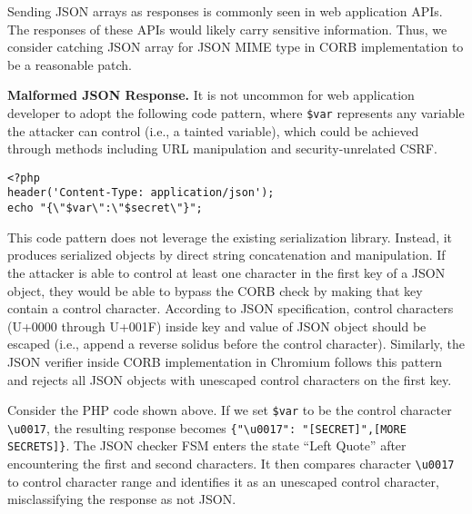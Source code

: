\documentclass[10pt,conference]{IEEEtran}
\begin{document}
Sending JSON arrays as responses is commonly seen in web application APIs. The responses of these APIs would likely carry sensitive information. Thus, we consider catching JSON array for JSON MIME type in CORB implementation to be a reasonable patch. 


\textbf{Malformed JSON Response.} It is not uncommon for web application developer to adopt the following code pattern, where \verb|$var| represents any variable the attacker can control (i.e., a tainted variable), which could be achieved through methods including URL manipulation and security-unrelated CSRF\cite{shankar_d1r3wolf_chaining_nodate}.%



\begin{lstlisting}
<?php
header('Content-Type: application/json');
echo "{\"$var\":\"$secret\"}";
\end{lstlisting}

This code pattern does not leverage the existing serialization library. Instead, it produces serialized objects by direct string concatenation and manipulation. If the attacker is able to control at least one character in the first key of a JSON object, they would be able to bypass the CORB check by making that key contain a control character. According to JSON specification, control characters (U+0000 through U+001F) inside key and value of JSON object should be escaped (i.e., append a reverse solidus before the control character). Similarly, the JSON verifier inside CORB implementation in Chromium follows this pattern and rejects all JSON objects with unescaped control characters on the first key. 

Consider the PHP code shown above. If we set \verb|$var| to be the control character \verb|\u0017|, the resulting response becomes \verb|{"\u0017": "[SECRET]",[MORE SECRETS]}|. The JSON checker FSM enters the state ``Left Quote'' after encountering the first and second characters. It then compares character \verb|\u0017| to control character range and identifies it as an unescaped control character, misclassifying the response as not JSON.

\end{document}
